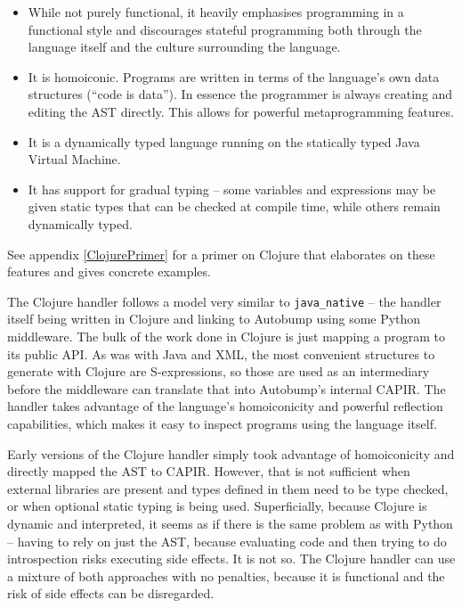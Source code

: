 \documentclass{l4proj}
\newcommand\genericstyle{\lstset{basicstyle=\ttm}}
\newcommand\codeinline[1]{{\genericstyle\lstinline!#1!}}
\begin{document}
\begin{itemize}
\item While not purely functional, it heavily emphasises programming
in a functional style and discourages stateful programming both through the
language itself and the culture surrounding the language.
\item It is homoiconic. Programs are written in terms of the
language's own data structures (``code is data''). In essence the
programmer is always creating and editing the AST directly. This
allows for powerful metaprogramming features.
\item It is a dynamically typed language running on the statically
typed Java Virtual Machine.
\item It has support for gradual typing --
some variables and expressions may be given static types that can be
checked at compile time, while others remain dynamically typed.
\end{itemize}

See appendix \ref{ClojurePrimer} for a primer on Clojure that
elaborates on these features and gives concrete examples.

The Clojure handler follows a model very similar to \codeinline{java_native}
-- the handler itself being written in Clojure and linking to Autobump
using some Python middleware. The bulk of the work done in Clojure is
just mapping a program to its public API. As was with Java and XML,
the most convenient structures to generate with Clojure are
S-expressions, so those are used as an intermediary before the
middleware can translate that into Autobump's internal CAPIR. The
handler takes advantage of the language's homoiconicity and powerful
reflection capabilities, which makes it easy to inspect programs using
the language itself.

Early versions of the Clojure handler simply took advantage of
homoiconicity and directly mapped the AST to CAPIR. However, that is
not sufficient when external libraries are present and types defined
in them need to be type checked, or when optional static typing is being used.
Superficially, because Clojure is dynamic and interpreted, it seems as
if there is the same problem as with Python -- having to
rely on just the AST, because evaluating code and then trying to do
introspection risks executing side effects. It is not so. The Clojure
handler can use a mixture of both approaches with no penalties,
because it is functional and the risk of side effects can be disregarded.

\end{document}
